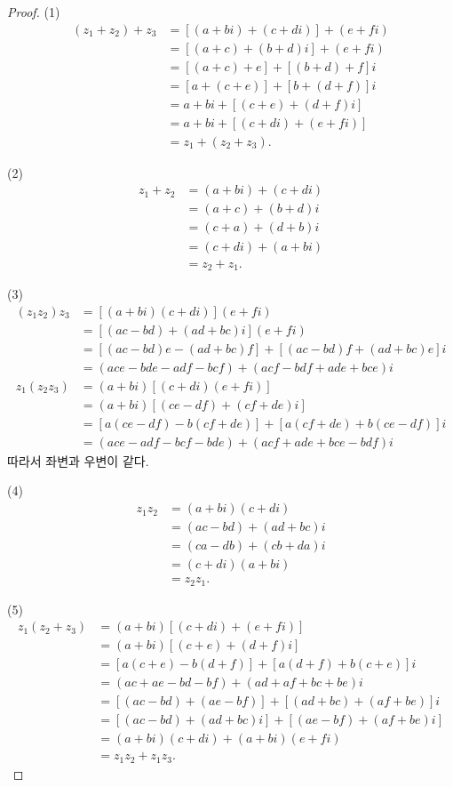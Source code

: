 \documentclass{article}
\begin{document}
\begin{proof}
(1)
\begin{align*}
(z_1+z_2)+z_3
&=[(a+bi)+(c+di)]+(e+fi)\\
&=[(a+c)+(b+d)i]+(e+fi)\\
&=[(a+c)+e]+[(b+d)+f]i\\
&=[a+(c+e)]+[b+(d+f)]i\\
&=a+bi+[(c+e)+(d+f)i]\\
&=a+bi+[(c+di)+(e+fi)]\\
&=z_1+(z_2+z_3).
\end{align*}

(2)
\begin{align*}
z_1+z_2
&=(a+bi)+(c+di)\\
&=(a+c)+(b+d)i\\
&=(c+a)+(d+b)i\\
&=(c+di)+(a+bi)\\
&=z_2+z_1.
\end{align*}

(3)
\begin{align*}
(z_1z_2)z_3
&=[(a+bi)(c+di)](e+fi)\\
&=[(ac-bd)+(ad+bc)i](e+fi)\\
&=[(ac-bd)e-(ad+bc)f]+[(ac-bd)f+(ad+bc)e]i\\
&=(ace-bde-adf-bcf)+(acf-bdf+ade+bce)i
\end{align*}
\begin{align*}
z_1(z_2z_3)
&=(a+bi)[(c+di)(e+fi)]\\
&=(a+bi)[(ce-df)+(cf+de)i]\\
&=[a(ce-df)-b(cf+de)]+[a(cf+de)+b(ce-df)]i\\
&=(ace-adf-bcf-bde)+(acf+ade+bce-bdf)i
\end{align*}
따라서 좌변과 우변이 같다.

(4)
\begin{align*}
z_1z_2
&=(a+bi)(c+di)\\
&=(ac-bd)+(ad+bc)i\\
&=(ca-db)+(cb+da)i\\
&=(c+di)(a+bi)\\
&=z_2z_1.
\end{align*}

(5)
\begin{align*}
z_1(z_2+z_3)
&=(a+bi)[(c+di)+(e+fi)]\\
&=(a+bi)[(c+e)+(d+f)i]\\
&=[a(c+e)-b(d+f)]+[a(d+f)+b(c+e)]i\\
&=(ac+ae-bd-bf)+(ad+af+bc+be)i\\
&=[(ac-bd)+(ae-bf)]+[(ad+bc)+(af+be)]i\\
&=[(ac-bd)+(ad+bc)i]+[(ae-bf)+(af+be)i]\\
&=(a+bi)(c+di)+(a+bi)(e+fi)\\
&=z_1z_2+z_1z_3.
\end{align*}
\end{proof}
\end{document}
